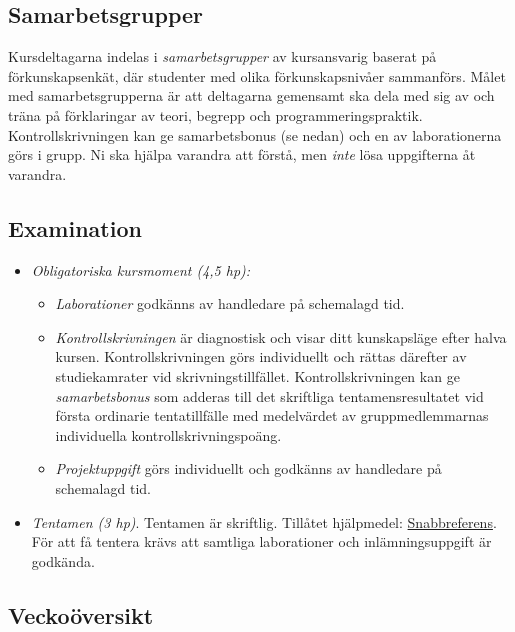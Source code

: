 \documentclass[a4paper,12pt,oneside]{memoir}
\newcommand{\TENTADATUM}{\colorbox{yellow}{8:e Januari, kl 08:00--13:00, se schema}}
\newcommand{\KSDATUM}{\colorbox{yellow}{Tisdagen 24:e Oktober, kl 14:00--19:00, se schema}}
\begin{document}
\subsection{Samarbetsgrupper}\label{samarbetsgrupper}

Kursdeltagarna indelas i \emph{samarbetsgrupper} av kursansvarig baserat
på förkunskapsenkät, där studenter med olika förkunskapsnivåer
sammanförs. Målet med samarbetsgrupperna är att deltagarna gemensamt ska
dela med sig av och träna på förklaringar av teori, begrepp och
programmeringspraktik. Kontrollskrivningen kan ge samarbetsbonus (se
nedan) och en av laborationerna görs i grupp. Ni ska hjälpa varandra att
förstå, men \emph{inte} lösa uppgifterna åt varandra.

\subsection{Examination}\label{examination}

\begin{itemize}
\item
  \emph{Obligatoriska kursmoment (4,5 hp):}

  \begin{itemize}
  \item
    \emph{Laborationer} godkänns av handledare på schemalagd tid.
  \item
    \emph{Kontrollskrivningen} är diagnostisk och visar ditt kunskapsläge efter
    halva kursen. Kontrollskrivningen görs individuellt och rättas
    därefter av studiekamrater vid skrivningstillfället.
    Kontrollskrivningen kan ge \emph{samarbetsbonus} som adderas till
    det skriftliga tentamensresultatet vid första ordinarie
    tentatillfälle med medelvärdet av gruppmedlemmarnas individuella
    kontrollskrivningspoäng. %
  \item
    \emph{Projektuppgift} görs individuellt och godkänns av handledare på
    schemalagd tid.
  \end{itemize}

\item
  \emph{Tentamen (3 hp)}. Tentamen är skriftlig. Tillåtet hjälpmedel:
  \href{http://cs.lth.se/pgk/quickref}{Snabbreferens}. \\
  För att få tentera krävs att samtliga laborationer och inlämningsuppgift är godkända.\\
\end{itemize}

\clearpage

\subsection*{Veckoöversikt}

\resizebox{\columnwidth}{!}{%
{\fontsize{12pt}{24pt}\selectfont

}
}
\end{document}
